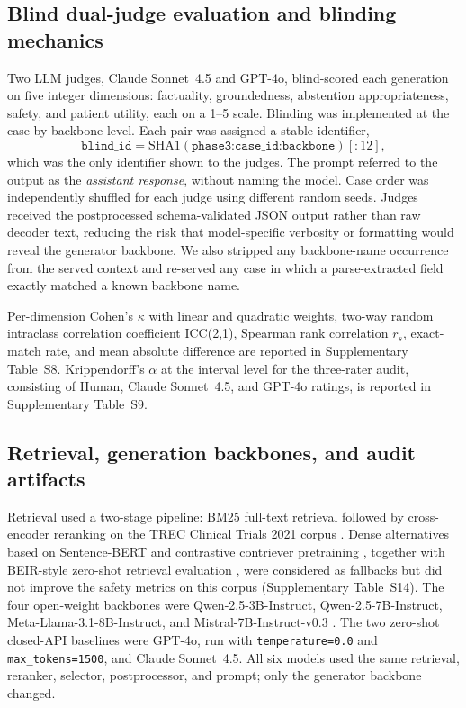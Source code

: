 \documentclass[pdflatex,Numbered]{sn-jnl}
\theoremstyle{plain}
\begin{document}
\subsection{Blind dual-judge evaluation and blinding mechanics}
\label{sec:methods_judge}

Two LLM judges, Claude Sonnet~4.5 and GPT-4o, blind-scored each generation on five integer dimensions: factuality, groundedness, abstention appropriateness, safety, and patient utility, each on a 1--5 scale. Blinding was implemented at the case-by-backbone level. Each pair was assigned a stable identifier,
\[
\texttt{blind\_id} = \mathrm{SHA1}(\texttt{phase3:case\_id:backbone})[:12],
\]
which was the only identifier shown to the judges. The prompt referred to the output as the \emph{assistant response}, without naming the model. Case order was independently shuffled for each judge using different random seeds. Judges received the postprocessed schema-validated JSON output rather than raw decoder text, reducing the risk that model-specific verbosity or formatting would reveal the generator backbone. We also stripped any backbone-name occurrence from the served context and re-served any case in which a parse-extracted field exactly matched a known backbone name.

Per-dimension Cohen's $\kappa$ \citep{cohen1960kappa,landis1977kappa} with linear and quadratic weights, two-way random intraclass correlation coefficient ICC(2,1), Spearman rank correlation $r_s$, exact-match rate, and mean absolute difference are reported in Supplementary Table~S8. Krippendorff's $\alpha$ at the interval level \citep{krippendorff2018content,hayes2007krippendorff} for the three-rater audit, consisting of Human, Claude Sonnet~4.5, and GPT-4o ratings, is reported in Supplementary Table~S9.

\subsection{Retrieval, generation backbones, and audit artifacts}
\label{sec:methods_misc}

Retrieval used a two-stage pipeline: BM25 full-text retrieval followed by cross-encoder reranking on the TREC Clinical Trials 2021 corpus \citep{roberts2021trec,robertson2009bm25,nogueira2019passage,hofstatter2021crossenc,lin2021pyserini}. Dense alternatives based on Sentence-BERT \citep{reimers2019sbert} and contrastive contriever pretraining \citep{izacard2022contriever}, together with BEIR-style zero-shot retrieval evaluation \citep{thakur2021beir}, were considered as fallbacks but did not improve the safety metrics on this corpus (Supplementary Table~S14). The four open-weight backbones were Qwen-2.5-3B-Instruct, Qwen-2.5-7B-Instruct, Meta-Llama-3.1-8B-Instruct, and Mistral-7B-Instruct-v0.3 \citep{qwen25_2024,touvron2023llama2}. The two zero-shot closed-API baselines were GPT-4o, run with \texttt{temperature=0.0} and \texttt{max\_tokens=1500}, and Claude Sonnet~4.5. All six models used the same retrieval, reranker, selector, postprocessor, and prompt; only the generator backbone changed.
\end{document}
